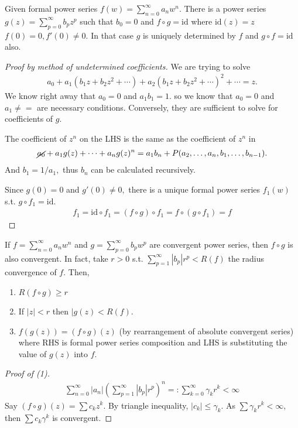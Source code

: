 \documentclass[a4paper,12pt]{article}
\begin{document}
\begin{theorem}
    Given formal power series $f(w)=\sum_{n=0}^\infty a_nw^n.$ There is a power series $g(z)=\sum_{p=0}^\infty b_pz^p$ such that $b_0=0$ and $f\circ g=\mathrm{id}$ where $\mathrm{id}(z)=z$  $f(0)=0,f'(0)\neq0.$ In that case $g$ is uniquely determined by $f$ and $g\circ f=\mathrm{id}$ also.
    \begin{proof}[Proof by method of undetermined coefficients]
        We are trying to solve \begin{align}
            a_0+a_1(b_1z+b_2z^2+\cdots)+a_2(b_1z+b_2z^2+\cdots)^2+\cdots=z.
        \end{align}
        We know right away that $a_0=0$ and $a_1b_1=1.$ so we know that $a_0=0$ and $a_1\neq=$ are necessary conditions. Conversely, they are sufficient to solve for  coefficients of $g$.

        The coefficient of $z^n$ on the LHS is the same as the coefficient of $z^n$ in \begin{align}
            \cancel{a_0}+a_1g(z)+\cdots+a_ng(z)^n=a_1b_n+P(a_2,\dots,a_n,b_1,\dots,b_{n-1}).
        \end{align}
        And $b_1=1/a_1,$ thus $b_n$ can be calculated recursively.

        Since $g(0)=0$ and $g'(0)\neq0,$ there is a unique formal power series $f_1(w)$ s.t. $g\circ f_1=\mathrm{id}.$\begin{align}
            f_1=\mathrm{id}\circ f_1=(f\circ g)\circ f_1=f\circ(g\circ f_1)=f
        \end{align}
    \end{proof}
\end{theorem}
\begin{proposition}
    If $f=\sum_{n=0}^\infty a_nw^n$ and $g=\sum_{p=0}^\infty b_pw^p$ are convergent power series, then $f\circ g$ is also convergent. In fact, take $r>0$ s.t. $\sum_{p=1}^\infty|b_p|r^p<R(f)$ the radius convergence of $f.$ Then,\begin{enumerate}[label=(\arabic*)]
        \item $R(f\circ g)\geq r$
        \item If $|z|<r$ then $|g(z)<R(f).$
        \item $f(g(z))=(f\circ g)(z)$ (by rearrangement of absolute convergent series) where RHS is formal power series composition and LHS is substituting the value of $g(z)$ into $f.$
    \end{enumerate}
    \begin{proof}[Proof of (1)]
        \begin{align}
            \sum_{n=0}^\infty|a_n|\left(\sum_{p=1}^\infty|b_p|r^p\right)^n=:\sum_{k=0}^\infty\gamma_kr^k<\infty
        \end{align}
        Say $(f\circ g)(z)=\sum c_kz^k.$ By triangle inequality, $|c_k|\leq\gamma_k.$ As $\sum\gamma_kr^k<\infty,$ then $\sum c_k\gamma^k$ is convergent.
    \end{proof}
\end{proposition}
\end{document}
